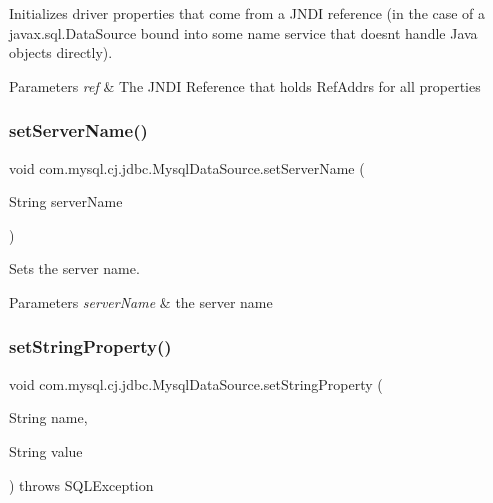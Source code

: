 Initializes driver properties that come from a J\+N\+DI reference (in the case of a javax.\+sql.\+Data\+Source bound into some name service that doesn\textquotesingle{}t handle Java objects directly).


\begin{DoxyParams}{Parameters}
{\em ref} & The J\+N\+DI Reference that holds Ref\+Addrs for all properties \\
\hline
\end{DoxyParams}
\mbox{\label{classcom_1_1mysql_1_1cj_1_1jdbc_1_1_mysql_data_source_ab8d27cf5e8488999237c5ee21f56803e}} 
\subsubsection{\texorpdfstring{set\+Server\+Name()}{setServerName()}}
{\footnotesize\ttfamily void com.\+mysql.\+cj.\+jdbc.\+Mysql\+Data\+Source.\+set\+Server\+Name (\begin{DoxyParamCaption}\item[{String}]{server\+Name }\end{DoxyParamCaption})}

Sets the server name.


\begin{DoxyParams}{Parameters}
{\em server\+Name} & the server name \\
\hline
\end{DoxyParams}
\mbox{\label{classcom_1_1mysql_1_1cj_1_1jdbc_1_1_mysql_data_source_a334cf512df25113c3275e866ddd91cf8}} 
\subsubsection{\texorpdfstring{set\+String\+Property()}{setStringProperty()}}
{\footnotesize\ttfamily void com.\+mysql.\+cj.\+jdbc.\+Mysql\+Data\+Source.\+set\+String\+Property (\begin{DoxyParamCaption}\item[{String}]{name,  }\item[{String}]{value }\end{DoxyParamCaption}) throws S\+Q\+L\+Exception\hspace{0.3cm}{\ttfamily [protected]}}

